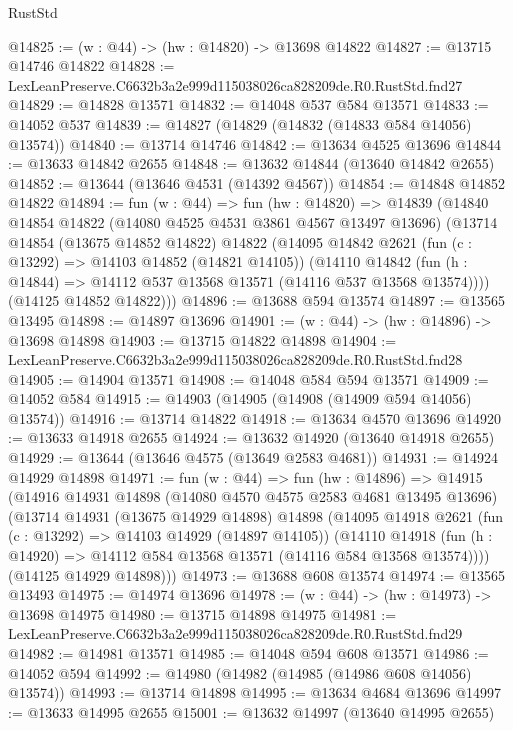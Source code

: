 \begin{lexlean}{RustStd}
\begin{coremodule}
@14825 := (w : @44) -> (hw : @14820) -> @13698 @14822
@14827 := @13715 @14746 @14822
@14828 := LexLeanPreserve.C6632b3a2e999d115038026ca828209de.R0.RustStd.fnd27
@14829 := @14828 @13571
@14832 := @14048 @537 @584 @13571
@14833 := @14052 @537
@14839 := @14827 (@14829 (@14832 (@14833 @584 @14056) @13574))
@14840 := @13714 @14746
@14842 := @13634 @4525 @13696
@14844 := @13633 @14842 @2655
@14848 := @13632 @14844 (@13640 @14842 @2655)
@14852 := @13644 (@13646 @4531 (@14392 @4567))
@14854 := @14848 @14852 @14822
@14894 := fun (w : @44) =>
  fun (hw : @14820) =>
  @14839
    (@14840
      @14854
      @14822
      (@14080 @4525 @4531 @3861 @4567 @13497 @13696)
      (@13714
        @14854
        (@13675 @14852 @14822)
        @14822
        (@14095
          @14842
          @2621
          (fun (c : @13292) => @14103 @14852 (@14821 @14105))
          (@14110
            @14842
            (fun (h : @14844) => @14112 @537 @13568 @13571 (@14116 @537 @13568 @13574))))
        (@14125 @14852 @14822)))
@14896 := @13688 @594 @13574
@14897 := @13565 @13495
@14898 := @14897 @13696
@14901 := (w : @44) -> (hw : @14896) -> @13698 @14898
@14903 := @13715 @14822 @14898
@14904 := LexLeanPreserve.C6632b3a2e999d115038026ca828209de.R0.RustStd.fnd28
@14905 := @14904 @13571
@14908 := @14048 @584 @594 @13571
@14909 := @14052 @584
@14915 := @14903 (@14905 (@14908 (@14909 @594 @14056) @13574))
@14916 := @13714 @14822
@14918 := @13634 @4570 @13696
@14920 := @13633 @14918 @2655
@14924 := @13632 @14920 (@13640 @14918 @2655)
@14929 := @13644 (@13646 @4575 (@13649 @2583 @4681))
@14931 := @14924 @14929 @14898
@14971 := fun (w : @44) =>
  fun (hw : @14896) =>
  @14915
    (@14916
      @14931
      @14898
      (@14080 @4570 @4575 @2583 @4681 @13495 @13696)
      (@13714
        @14931
        (@13675 @14929 @14898)
        @14898
        (@14095
          @14918
          @2621
          (fun (c : @13292) => @14103 @14929 (@14897 @14105))
          (@14110
            @14918
            (fun (h : @14920) => @14112 @584 @13568 @13571 (@14116 @584 @13568 @13574))))
        (@14125 @14929 @14898)))
@14973 := @13688 @608 @13574
@14974 := @13565 @13493
@14975 := @14974 @13696
@14978 := (w : @44) -> (hw : @14973) -> @13698 @14975
@14980 := @13715 @14898 @14975
@14981 := LexLeanPreserve.C6632b3a2e999d115038026ca828209de.R0.RustStd.fnd29
@14982 := @14981 @13571
@14985 := @14048 @594 @608 @13571
@14986 := @14052 @594
@14992 := @14980 (@14982 (@14985 (@14986 @608 @14056) @13574))
@14993 := @13714 @14898
@14995 := @13634 @4684 @13696
@14997 := @13633 @14995 @2655
@15001 := @13632 @14997 (@13640 @14995 @2655)

\end{coremodule}
\end{lexlean}
